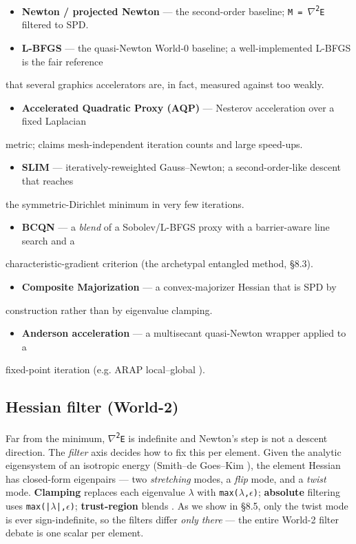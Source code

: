 \documentclass{egpubl}
\begin{document}
\begin{itemize}
  \item \textbf{Newton / projected Newton} --- the second-order baseline; \texttt{M = $\nabla$\textsuperscript{2}E} filtered to SPD.
  \item \textbf{L-BFGS} --- the quasi-Newton World-0 baseline; a well-implemented L-BFGS is the fair reference
\end{itemize}
  that several graphics accelerators are, in fact, measured against too weakly.
\begin{itemize}
  \item \textbf{Accelerated Quadratic Proxy (AQP)} \cite{aqp} --- Nesterov acceleration over a fixed Laplacian
\end{itemize}
  metric; claims mesh-independent iteration counts and large speed-ups.
\begin{itemize}
  \item \textbf{SLIM} \cite{slim} --- iteratively-reweighted Gauss--Newton; a second-order-like descent that reaches
\end{itemize}
  the symmetric-Dirichlet minimum in very few iterations.
\begin{itemize}
  \item \textbf{BCQN} \cite{bcqn} --- a \emph{blend} of a Sobolev/L-BFGS proxy with a barrier-aware line search and a
\end{itemize}
  characteristic-gradient criterion (the archetypal entangled method, \S8.3).
\begin{itemize}
  \item \textbf{Composite Majorization} \cite{composite-majorization} --- a convex-majorizer Hessian that is SPD by
\end{itemize}
  construction rather than by eigenvalue clamping.
\begin{itemize}
  \item \textbf{Anderson acceleration} \cite{anderson-geometry} --- a multisecant quasi-Newton wrapper applied to a
\end{itemize}
  fixed-point iteration (e.g. ARAP local--global \cite{local-global}).

\subsection{Hessian filter (World-2)}

Far from the minimum, \texttt{$\nabla$\textsuperscript{2}E} is indefinite and Newton's step is not a descent direction. The \emph{filter}
axis decides how to fix this per element. Given the analytic eigensystem of an isotropic energy
(Smith--de Goes--Kim \cite{analytic-eigensystems}), the element Hessian has closed-form eigenpairs ---
two \emph{stretching} modes, a \emph{flip} mode, and a \emph{twist} mode. \textbf{Clamping} \cite{clamp-filtering}
replaces each eigenvalue \texttt{$\lambda$} with \texttt{max($\lambda$,$\epsilon$)}; \textbf{absolute} filtering \cite{absolute-filtering} uses
\texttt{max(|$\lambda$|,$\epsilon$)}; \textbf{trust-region} blends \cite{trust-region-filtering}. As we show in \S8.5, only the twist
mode is ever sign-indefinite, so the filters differ \emph{only there} --- the entire World-2 filter debate is
one scalar per element.
\end{document}
